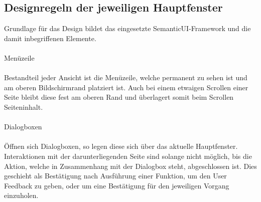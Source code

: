 \documentclass[11pt,
paper=a4,
bibtotocnumbered,	  %
liststotocnumbered,  %
DIV=calc,		  %
tablecaptionabove,	  %
headinclude,
]{article}
\begin{document}
\subsection{Designregeln der jeweiligen Hauptfenster}
Grundlage für das Design bildet das eingesetzte SemanticUI-Framework und die damit inbegriffenen Elemente. \\\\

Menüzeile\\\\
Bestandteil jeder Ansicht ist die Menüzeile, welche permanent zu sehen ist und am oberen Bildschirmrand platziert ist. Auch bei einem etwaigen Scrollen einer Seite bleibt diese fest am oberen Rand und überlagert somit beim Scrollen Seiteninhalt.\\\\

Dialogboxen\\\\
Öffnen sich Dialogboxen, so legen diese sich über das aktuelle Hauptfenster. Interaktionen mit der darunterliegenden Seite sind solange nicht möglich, bis die Aktion, welche in Zusammenhang mit der Dialogbox steht, abgeschlossen ist. Dies geschieht als Bestätigung nach Ausführung einer Funktion, um den User Feedback zu geben, oder um eine Bestätigung für den jeweiligen Vorgang einzuholen. 
\end{document}
